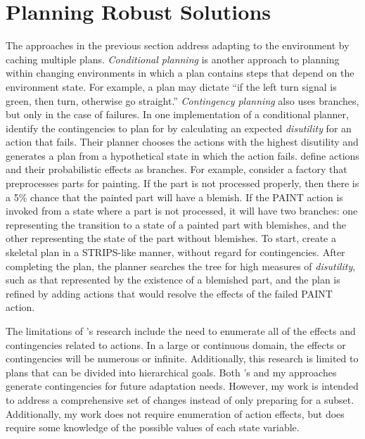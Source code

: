 
\section{Planning Robust Solutions}

The approaches in the previous section address adapting to the environment by caching multiple plans.  \textit{Conditional planning} is another approach to planning within changing environments in which a plan contains steps that depend on the  environment state.  For example, a plan may dictate ``if the left turn signal is green, then turn, otherwise go straight.''    \textit{Contingency planning} also uses branches, but only in the case of failures.  In one implementation of a conditional planner, \citet{onder96contingency} identify the contingencies to plan for by calculating an expected {\it disutility} for an action that fails.  Their planner chooses the actions with the highest disutility and generates a plan from a hypothetical state in which the action fails.  \citeauthor{onder96contingency} define actions and their probabilistic effects as branches.  For example, consider a factory that preprocesses parts for painting.  If the part is not processed properly, then there is a 5\% chance that the painted part will have a blemish.  If the PAINT action is invoked from a state where a part is not processed, it will have two branches:  one representing the transition to a state of a painted part with blemishes, and the other representing the state of the part without blemishes.  To start, \citeauthor{onder96contingency} create a skeletal plan in a STRIPS-like manner, without regard for contingencies.  After completing the plan, the planner searches the tree for high measures of \textit{disutility}, such as that represented by the existence of a blemished part, and the plan is refined by adding actions that would resolve the effects of the failed PAINT action.  

The limitations of \citeauthor{onder96contingency}'s research include the need to enumerate all of  the effects and contingencies related to actions.  In a large or continuous domain, the effects or contingencies will be numerous or infinite.  Additionally, this research is limited to plans that can be divided into hierarchical goals.  Both  \citeauthor{onder96contingency}'s and my approaches generate contingencies for future adaptation needs.  However, my work is intended to address a comprehensive set of changes instead of only preparing for a subset.  Additionally, my work does not require enumeration of action effects, but does require some knowledge of the possible values of each state variable.

